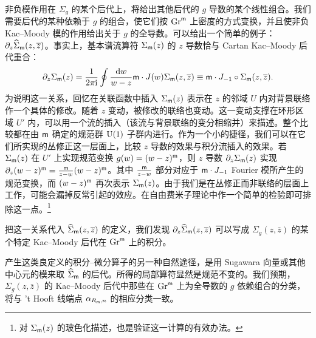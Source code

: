 非负模作用在 $\Sigma_{g}$ 的某个后代上，将给出其他后代的 $g$ 导数的某个线性组合。我们需要后代的某种依赖于 $g$ 的组合，使它们按 $\mathrm{Gr}^{\sf m}$ 上密度的方式变换，并且使非负 Kac--Moody 模的作用给出关于 $g$ 的全导数。可以给出一个简单的例子：$\partial_z \widehat\Sigma_{\sf m}(z, \overline z)$。事实上，基本谱流算符 $\Sigma_{\sf m}(z)$ 的 $z$ 导数恰与 Cartan Kac--Moody 后代重合：
\begin{equation}\label{firstone} \partial_z \Sigma_{\sf m}(z)= \frac{1}{2 \pi {\mathrm i}} \oint \frac{{\mathrm d} w}{w-z} {\sf m} \cdot J (w) \Sigma_{\sf m}(z, \overline z)\equiv  {\sf m} \cdot J_{-1} \circ \Sigma_{\sf m}(z, \overline z). \end{equation}
为说明这一关系，回忆在关联函数中插入 $\Sigma_{\sf m}(z)$ 表示在 $z$ 的邻域 $U$ 内对背景联络作一个具体的修改。随着 $z$ 变动，被修改的联络也变动。这一变动支撑在环形区域 $U'$ 内，可以用一个流的插入（该流与背景联络的变分相缩并）来描述。整个比较都在由 ${\sf m}$ 确定的规范群 ${\mathrm U}(1)$ 子群内进行。作为一个小的捷径，我们可以在它们所实现的丛修正这一层面上，比较 $z$ 导数的效果与积分流插入的效果。若 $\Sigma_{\sf m}(z)$ 在 $U'$ 上实现规范变换 $g(w) = (w-z)^{\sf m}$，则 $z$ 导数 $\partial_z \Sigma_{\sf m}(z)$ 实现 $\partial_z  (w-z)^{\sf m} = \frac{{\sf m}}{z-w} (w-z)^{\sf m}$。其中 $\frac{{\sf m}}{z-w}$ 部分对应于 ${\sf m} \cdot J_{-1}$ Fourier 模所产生的规范变换，而 $(w-z)^{\sf m}$ 再次表示 $\Sigma_{\sf m}(z)$。由于我们是在丛修正而非联络的层面上工作，可能会漏掉反常引起的效应。在自由费米子理论中作一个简单的检验即可排除这一点。\footnote{对 $\Sigma_{\sf m}(z)$ 的玻色化描述，也是验证这一计算的有效办法。}

把这一关系代入 $\widehat\Sigma_{\sf m}(z, \overline z)$ 的定义，我们发现 $\partial_z \widehat\Sigma_{\sf m}(z, \overline z)$ 可以写成 $\Sigma_{g}(z, \bar z)$ 的某个特定 Kac--Moody 后代在 ${\mathrm{Gr}}^{\sf m}$ 上的积分。

产生这类良定义的积分–微分算子的另一种自然途径，是用 Sugawara 向量或其他中心元的模来取 $\widehat\Sigma_{\sf m}$ 的后代。所得的局部算符显然是规范不变的。我们预期，$\Sigma_{g}(z, \bar z)$ 的 Kac--Moody 后代中那些在 $\mathrm{Gr}^{\sf m}$ 上为全导数的 $g$ 依赖组合的分类，将与 't Hooft 线端点 $\alpha_{R_{\sf m},n}$ 的相应分类一致。

%


